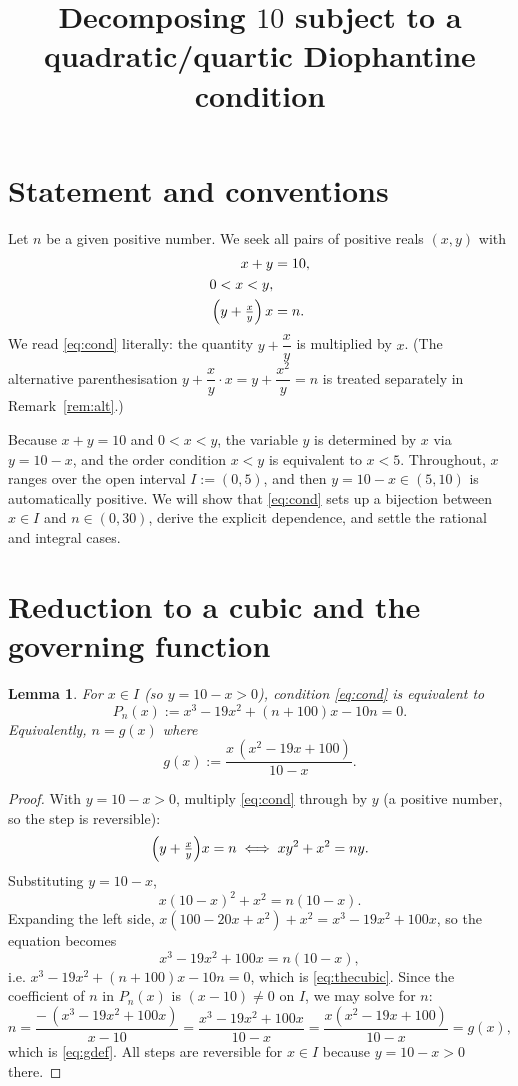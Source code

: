 \documentclass{amsart}
\newtheorem{lemma}{Lemma}
\theoremstyle{remark}
\begin{document}
\title{Decomposing $10$ subject to a quadratic/quartic Diophantine condition}
\maketitle

\section{Statement and conventions}

Let $n$ be a given positive number. We seek all pairs of positive reals
$(x,y)$ with
\begin{align}
x+y&=10, \label{eq:sum}\\
0<x<y, \label{eq:order}\\
\Bigl(y+\tfrac{x}{y}\Bigr)\,x&=n. \label{eq:cond}
\end{align}
We read \eqref{eq:cond} literally: the quantity $y+\dfrac{x}{y}$ is multiplied
by $x$. (The alternative parenthesisation $y+\dfrac{x}{y}\cdot x=y+\dfrac{x^{2}}{y}=n$
is treated separately in Remark~\ref{rem:alt}.)

Because $x+y=10$ and $0<x<y$, the variable $y$ is determined by $x$ via
$y=10-x$, and the order condition $x<y$ is equivalent to $x<5$. Throughout,
$x$ ranges over the open interval $I:=(0,5)$, and then $y=10-x\in(5,10)$ is
automatically positive. We will show that \eqref{eq:cond} sets up a bijection
between $x\in I$ and $n\in(0,30)$, derive the explicit dependence, and settle
the rational and integral cases.

\section{Reduction to a cubic and the governing function}

\begin{lemma}\label{lem:cubic}
For $x\in I$ (so $y=10-x>0$), condition \eqref{eq:cond} is equivalent to
\begin{equation}\label{eq:thecubic}
P_n(x):=x^{3}-19x^{2}+(n+100)x-10n=0 .
\end{equation}
Equivalently, $n=g(x)$ where
\begin{equation}\label{eq:gdef}
g(x):=\frac{x\,(x^{2}-19x+100)}{10-x}.
\end{equation}
\end{lemma}

\begin{proof}
With $y=10-x>0$, multiply \eqref{eq:cond} through by $y$ (a positive number, so
the step is reversible):
\[
\Bigl(y+\tfrac{x}{y}\Bigr)x=n
\;\Longleftrightarrow\;
xy^{2}+x^{2}=ny .
\]
Substituting $y=10-x$,
\[
x(10-x)^{2}+x^{2}=n(10-x).
\]
Expanding the left side, $x(100-20x+x^{2})+x^{2}=x^{3}-19x^{2}+100x$, so the
equation becomes
\[
x^{3}-19x^{2}+100x=n(10-x),
\]
i.e. $x^{3}-19x^{2}+(n+100)x-10n=0$, which is \eqref{eq:thecubic}. Since the
coefficient of $n$ in $P_n(x)$ is $(x-10)\neq0$ on $I$, we may solve for $n$:
\[
n=\frac{-\,(x^{3}-19x^{2}+100x)}{x-10}
 =\frac{x^{3}-19x^{2}+100x}{10-x}
 =\frac{x(x^{2}-19x+100)}{10-x}=g(x),
\]
which is \eqref{eq:gdef}. All steps are reversible for $x\in I$ because
$y=10-x>0$ there.
\end{proof}
\end{document}
